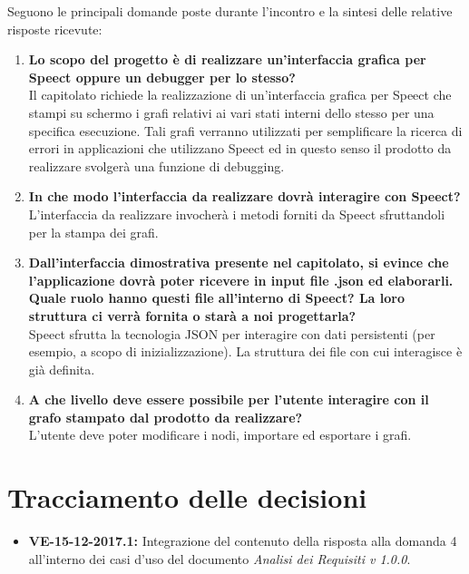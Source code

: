 \documentclass[openany,12pt,a4paper]{article}
\begin{document}
	\noindent Seguono le principali domande poste durante l'incontro e la sintesi delle relative risposte ricevute:
	
	\begin{enumerate}
	
	\item \textbf{Lo scopo del progetto è di realizzare un’interfaccia grafica per Speect oppure un debugger per lo stesso?}\\
	Il capitolato richiede la realizzazione di un'interfaccia grafica per Speect che stampi su schermo i grafi relativi ai vari stati interni dello stesso per una specifica esecuzione. Tali grafi verranno utilizzati per semplificare la ricerca di errori in applicazioni che utilizzano Speect ed in questo senso il prodotto da realizzare svolgerà una funzione di debugging.
    
    \item \textbf{In che modo l'interfaccia da realizzare dovrà interagire con Speect?}\\
    L'interfaccia da realizzare invocherà i metodi forniti da Speect sfruttandoli per la stampa dei grafi.
    
    \item \textbf{Dall'interfaccia dimostrativa presente nel capitolato, si evince che l'applicazione dovrà poter ricevere in input file .json ed elaborarli. Quale ruolo hanno questi file all'interno di Speect? La loro struttura ci verrà fornita o starà a noi progettarla?}\\
    Speect sfrutta la tecnologia JSON per interagire con dati persistenti (per esempio, a scopo di inizializzazione). La struttura dei file con cui interagisce è già definita.
    
    \item \textbf{A che livello deve essere possibile per l'utente interagire con il grafo stampato dal prodotto da realizzare?}\\
    L'utente deve poter modificare i nodi, importare ed esportare i grafi.
	
	\end{enumerate}
	
	\section{Tracciamento delle decisioni}
	
	\begin{itemize}
	    \item \textbf{VE-15-12-2017.1:} Integrazione del contenuto della risposta alla domanda 4 all'interno dei casi d'uso del documento \textit{Analisi dei Requisiti v 1.0.0}.
	\end{itemize}
	
	
\end{document}
